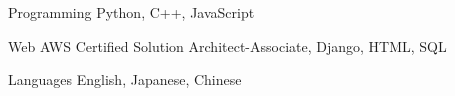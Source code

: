 


\begin{cvskills}


\cvskill
{Programming}
{Python, C++, JavaScript}


\cvskill
{Web} %
{AWS Certified Solution Architect-Associate, Django, HTML, SQL} %


\cvskill
{Languages} %
{English, Japanese, Chinese} %


\end{cvskills}